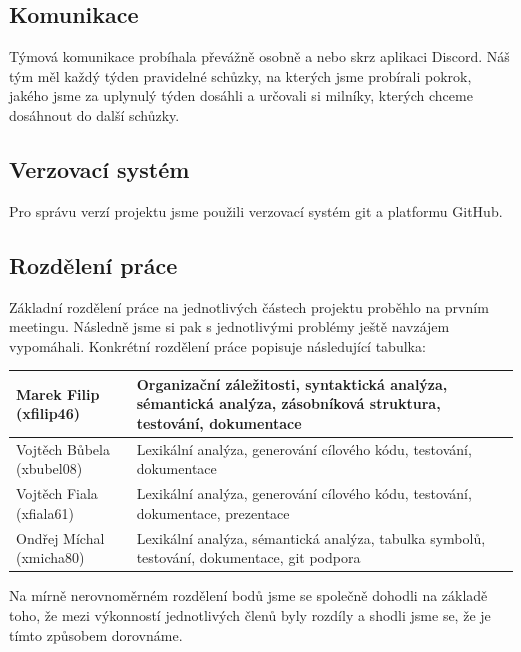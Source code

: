 \documentclass[12pt]{article}
\begin{document}
        \subsection{Komunikace}
        
        \large{Týmová komunikace probíhala převážně osobně a nebo skrz aplikaci Discord. Náš tým měl každý týden pravidelné schůzky, na kterých jsme probírali pokrok, jakého jsme za uplynulý týden dosáhli a určovali si milníky, kterých chceme dosáhnout do další schůzky.}
        
        \subsection{Verzovací systém}
        Pro správu verzí projektu jsme použili verzovací systém git a platformu GitHub.
        
        \subsection{Rozdělení práce}
        Základní rozdělení práce na jednotlivých částech projektu proběhlo na prvním meetingu. Následně jsme si pak s jednotlivými problémy ještě navzájem vypomáhali. Konkrétní rozdělení práce popisuje následující tabulka:
        \newline
        
        \begin{center}
        \begin{tabular}{|p{11em}|p{21em}|}
            \hline
            \textbf{Marek Filip} (\textbf{xfilip46}) &  
            Organizační záležitosti, syntaktická analýza, sémantická analýza, zásobníková struktura, testování, dokumentace\\
            \hline
            Vojtěch Bůbela (xbubel08)  & Lexikální analýza, generování cílového kódu,
            testování, dokumentace\\
            \hline
            Vojtěch Fiala (xfiala61) & Lexikální analýza, generování cílového kódu, testování, dokumentace, prezentace\\
            \hline
            Ondřej Míchal (xmicha80) & Lexikální analýza, sémantická analýza, tabulka symbolů, testování, dokumentace, git podpora\\
            \hline
        \end{tabular}
        \end{center}
        Na mírně nerovnoměrném rozdělení bodů jsme se společně dohodli na základě toho, že mezi výkonností jednotlivých členů byly rozdíly a shodli jsme se, že je tímto způsobem dorovnáme.
    
\end{document}
